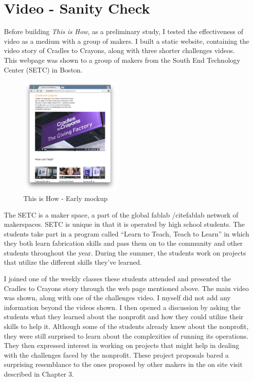 \section {Video - Sanity Check}

Before building \textit{This is How}, as a preliminary study, I tested the effectiveness of video as a medium with a group of makers. I built a static website, containing the video story of Cradles to Crayons, along with three shorter challenges videos. This webpage was shown to a group of makers from the South End Technology Center (SETC) in Boston.

   \begin{figure}[thpb]
      \centering
      \includegraphics[width=2in]{figures/thisishow-mockup.png}
      \caption{This is How - Early mockup}
      \label{fig_thisishow_mockup}
   \end{figure}

The SETC is a maker space, a part of the global fablab /cite{fablab} network of maker­spaces. SETC is unique in that it is operated by high school students. The students take part in a program called ``Learn to Teach, Teach to Learn'' in which they both learn fabrication skills and pass them on to the community and other students throughout the year. During the summer, the students work on projects that utilize the different skills they've learned.

I joined one of the weekly classes these students attended and presented the Cradles to Crayons story through the web page mentioned above. The main video was shown, along with one of the challenges video. I myself did not add any information beyond the videos shown. I then opened a discussion by asking the students what they learned about the nonprofit and how they could utilize their skills to help it. Although some of the students already knew about the nonprofit, they were still surprised to learn about the complexities of running its operations. They then expressed interest in working on projects that might help in dealing with the challenges faced by the nonprofit. These project proposals bared a surprising resemblance to the ones proposed by other makers in the on site visit described in Chapter 3.


